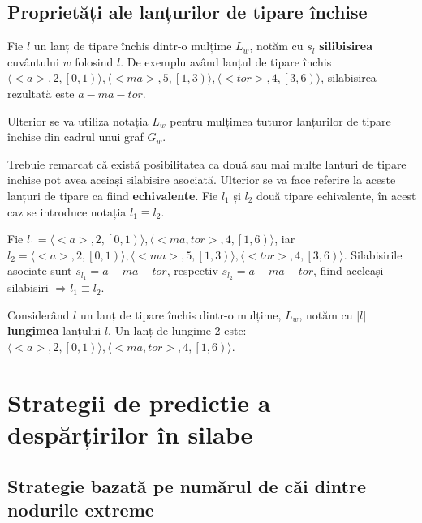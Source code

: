 \subsection{Proprietăți ale lanțurilor de tipare închise}

\begin{defi}
Fie $l$ un lanț de tipare închis dintr-o mulțime $L_w$, notăm cu $s_{l}$ \textbf{silibisirea} cuvântului $w$ folosind $l$. De exemplu având lanțul de tipare închis $\langle <a>, 2, \left[ 0, 1 \right)\rangle, \langle <ma>, 5, \left[ 1, 3 \right)\rangle, \langle <tor>, 4, \left[ 3, 6 \right)\rangle$, silabisirea rezultată este $a-ma-tor$. 
\end{defi}

Ulterior se va utiliza notația $L_w$ pentru mulțimea tuturor lanțurilor de tipare închise din cadrul unui graf $G_w$.

\begin{defi}
Trebuie remarcat că există posibilitatea ca două sau mai multe lanțuri de tipare inchise pot avea aceiași silabisire asociată. Ulterior se va face referire la aceste lanțuri de tipare ca fiind \textbf{echivalente}. Fie $l_1$ și $l_2$ două tipare echivalente, în acest caz se introduce notația $l_1 \equiv l_2$.
\end{defi}

\begin{ex}
Fie $l_1 = \langle <a>, 2, \left[ 0, 1 \right)\rangle, \langle <ma, tor>, 4, \left[ 1, 6 \right)\rangle$, iar $l_2 = \langle <a>, 2, \left[ 0, 1 \right)\rangle, \langle <ma>, 5, \left[ 1, 3 \right)\rangle, \langle <tor>, 4, \left[ 3, 6 \right)\rangle$. Silabisirile asociate sunt $s_{l_1} = a-ma-tor$, respectiv $s_{l_2} = a-ma-tor$, fiind aceleași silabisiri $\Rightarrow l_1 \equiv l_2$.
\end{ex}

\begin{defi}
Considerând $l$ un lanț de tipare închis dintr-o mulțime, $L_w$, notăm cu $\vert l \vert $ \textbf{lungimea} lanțului $l$. Un lanț de lungime 2 este: $\langle <a>, 2, \left[ 0, 1 \right)\rangle, \langle <ma, tor>, 4, \left[ 1, 6 \right)\rangle$.
\end{defi}


\section{Strategii de predictie a despărțirilor în silabe}

\subsection{Strategie bazată pe numărul de căi dintre nodurile extreme}

